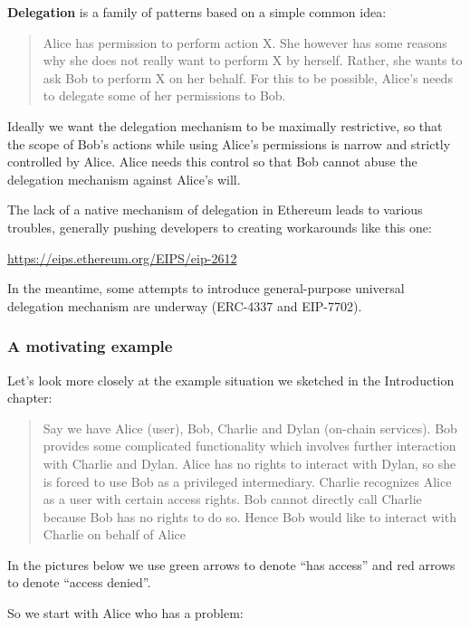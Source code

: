 \documentclass[a4paper]{article}
\begin{document}
\textbf{Delegation} is a family of patterns based on a simple common idea:

\begin{quote}

Alice has permission to perform action X. She however has some reasons why she does not really want to perform X by herself. Rather, she wants to ask Bob to perform X on her behalf. For this to be possible, Alice's needs to delegate some of her permissions to Bob.
\end{quote}

Ideally we want the delegation mechanism to be maximally restrictive, so that the scope of Bob's actions while using Alice's permissions is narrow and strictly controlled by Alice. Alice needs this control so that Bob cannot abuse the delegation mechanism against Alice's will.

The lack of a native mechanism of delegation in Ethereum leads to various troubles, generally pushing developers to creating workarounds like this one:

\href{https://eips.ethereum.org/EIPS/eip-2612}{https://eips.ethereum.org/EIPS/eip-2612}

In the meantime, some attempts to introduce general-purpose universal delegation mechanism are underway (ERC-4337 and EIP-7702).

\subsubsection{A motivating example}

Let's look more closely at the example situation we sketched in the Introduction chapter:

\begin{quote}

Say we have Alice (user), Bob, Charlie and Dylan (on-chain services). Bob provides some complicated functionality which involves further interaction with Charlie and Dylan. Alice has no rights to interact with Dylan, so she is forced to use Bob as a privileged intermediary. Charlie recognizes Alice as a user with certain access rights. Bob cannot directly call Charlie because Bob has no rights to do so. Hence Bob would like to interact with Charlie on behalf of Alice
\end{quote}

In the pictures below we use green arrows to denote ``has access'' and red arrows to denote ``access denied''.

So we start with Alice who has a problem:
\end{document}

